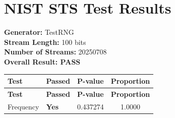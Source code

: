 \documentclass{article}
\begin{document}
\section*{NIST STS Test Results}
\textbf{Generator:} TestRNG \\
\textbf{Stream Length:} 100 bits \\
\textbf{Number of Streams:} 20250708 \\

\textbf{\textcolor{passgreen}{Overall Result: PASS}}

\begin{longtable}{llcc}
\toprule
\textbf{Test} & \textbf{Passed} & \textbf{P-value} & \textbf{Proportion} \\
\midrule
\endfirsthead
\toprule
\textbf{Test} & \textbf{Passed} & \textbf{P-value} & \textbf{Proportion} \\
\midrule
\endhead
\bottomrule
\endfoot

Frequency & \textcolor{passgreen}{\textbf{Yes}} & 0.437274 & 1.0000 \\

\end{longtable}
\end{document}
